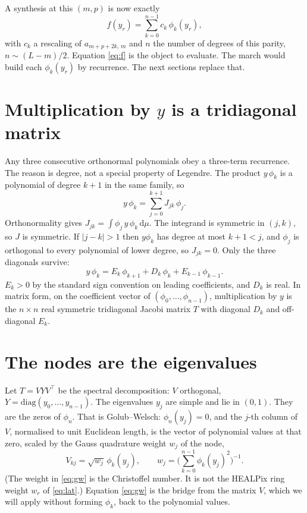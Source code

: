 \documentclass[11pt,a4paper]{article}
\numberwithin{equation}{section}
\begin{document}
A synthesis at this $(m,p)$ is now exactly
\begin{equation}
  f(y_r) = \sum_{k=0}^{n-1} c_k\,\phi_k(y_r),
  \label{eq:f}
\end{equation}
with $c_k$ a rescaling of $a_{m+p+2k,\, m}$ and $n$ the number of degrees of this
parity, $n\sim (L-m)/2$. Equation \eqref{eq:f} is the object to evaluate.
The march would build each $\phi_k(y_r)$ by recurrence. The next sections replace that.

\section{Multiplication by \texorpdfstring{$y$}{y} is a tridiagonal matrix}
\label{sec:jacobi}

Any three consecutive orthonormal polynomials obey a three-term recurrence. The reason
is degree, not a special property of Legendre. The product $y\,\phi_k$ is a polynomial
of degree $k+1$ in the same family, so
\[
  y\,\phi_k = \sum_{j=0}^{k+1} J_{jk}\,\phi_j.
\]
Orthonormality gives $J_{jk}=\int \phi_j\, y\,\phi_k\,\mathrm{d}\mu$.
The integrand is symmetric in $(j,k)$, so $J$ is symmetric.
If $|j-k|>1$ then $y\phi_k$ has degree at most $k+1<j$, and $\phi_j$ is orthogonal to
every polynomial of lower degree, so $J_{jk}=0$.
Only the three diagonals survive:
\begin{equation}
  y\,\phi_k = E_k\,\phi_{k+1} + D_k\,\phi_k + E_{k-1}\,\phi_{k-1}.
  \label{eq:rec}
\end{equation}
$E_k>0$ by the standard sign convention on leading coefficients, and $D_k$ is real.
In matrix form, on the coefficient vector of $(\phi_0,\dots,\phi_{n-1})$,
multiplication by $y$ is the $n\times n$ real symmetric tridiagonal Jacobi matrix $T$
with diagonal $D_k$ and off-diagonal $E_k$.

\section{The nodes are the eigenvalues}
\label{sec:spectral}

Let $T=VYV^\top$ be the spectral decomposition: $V$ orthogonal, $Y=\mathrm{diag}(y_0,\dots,y_{n-1})$.
The eigenvalues $y_j$ are simple and lie in $(0,1)$. They are the zeros of $\phi_n$.
That is Golub--Welsch: $\phi_n(y_j)=0$, and the $j$-th column of $V$, normalised to unit
Euclidean length, is the vector of polynomial values at that zero, scaled by the
Gauss quadrature weight $w_j$ of the node,
\begin{equation}
  V_{kj} = \sqrt{w_j}\,\phi_k(y_j),
  \qquad
  w_j=\Biggl(\sum_{k=0}^{n-1}\phi_k(y_j)^2\Biggr)^{-1}.
  \label{eq:gw}
\end{equation}
(The weight in \eqref{eq:gw} is the Christoffel number. It is not the HEALPix ring
weight $w_r$ of \eqref{eq:lat}.) Equation \eqref{eq:gw} is the bridge from the matrix
$V$, which we will apply without forming $\phi_k$, back to the polynomial values.
\end{document}
